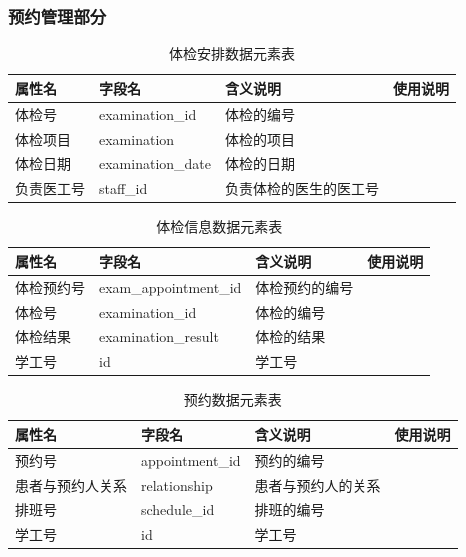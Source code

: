 \documentclass{article}
\begin{document}
\subsubsection{预约管理部分}

\begin{table}[H]
    \centering
    \begin{tabularx}{\textwidth}{|p{2.2cm}|p{3.3cm}|p{4.7cm}|p{5cm}|}
    \toprule
    \textbf{属性名} & \textbf{字段名} & \textbf{含义说明} & \textbf{使用说明} \\ \midrule
    体检号 & examination\_id & 体检的编号 &  \\ \midrule
    体检项目 & examination & 体检的项目 &  \\ \midrule
    体检日期 & examination\_date & 体检的日期 &  \\ \midrule
    负责医工号 & staff\_id & 负责体检的医生的医工号 &  \\ \bottomrule
    \end{tabularx}
    \caption{体检安排数据元素表}
    \label{tab:examination_arrangement_elements}
\end{table}

\begin{table}[H]
    \centering
    \begin{tabularx}{\textwidth}{|p{2.2cm}|p{3.3cm}|p{4.7cm}|p{5cm}|}
    \toprule
    \textbf{属性名} & \textbf{字段名} & \textbf{含义说明} & \textbf{使用说明} \\ \midrule
    体检预约号 & exam\_appointment\_id & 体检预约的编号 &  \\ \midrule
    体检号 & examination\_id & 体检的编号 &  \\ \midrule
    体检结果 & examination\_result & 体检的结果 &  \\ \midrule
    学工号 & id & 学工号 &  \\ \bottomrule
    \end{tabularx}
    \caption{体检信息数据元素表}
    \label{tab:examination_appointment_elements}
\end{table}

\begin{table}[H]
    \centering
    \begin{tabularx}{\textwidth}{|p{2.2cm}|p{3.3cm}|p{4.7cm}|p{5cm}|}
    \toprule
    \textbf{属性名} & \textbf{字段名} & \textbf{含义说明} & \textbf{使用说明} \\ \midrule
    预约号 & appointment\_id & 预约的编号 &  \\ \midrule
    患者与预约人关系 & relationship & 患者与预约人的关系 &  \\ \midrule
    排班号 & schedule\_id & 排班的编号 &  \\ \midrule
    学工号 & id & 学工号 &  \\ \bottomrule
    \end{tabularx}
    \caption{预约数据元素表}
    \label{tab:appointment_elements}
\end{table}
\end{document}

